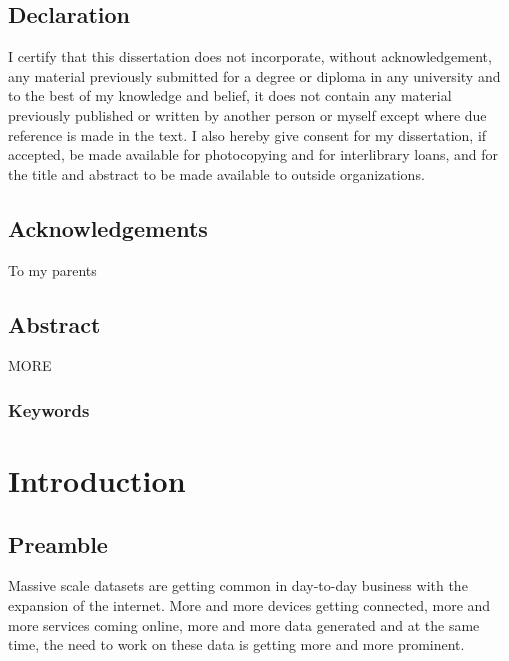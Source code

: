 \documentclass[12pt]{report}
\numberwithin{figure}{section}
\numberwithin{table}{section}
\begin{document}
\section*{Declaration}
%

I certify that this dissertation does not incorporate, without acknowledgement, any material previously submitted for a degree or diploma in any university and to the best of my knowledge and belief, it does not contain any material previously published or written by another person or myself except where due reference is made in the text. I also hereby give consent for my dissertation, if accepted, be made available for photocopying and for interlibrary loans, and for the title and abstract to be made available to outside organizations.

\newpage

\section*{Acknowledgements}
%
To my parents
\newpage


\section*{Abstract}
%

MORE

\subsection*{Keywords}

\newpage

\listoffigures

\tableofcontents

\newpage
{}



\chapter{Introduction}

\section{Preamble}

Massive scale datasets are getting common in day-to-day business with the expansion of the internet. More and more devices getting connected, more and more services coming online, more and more data generated and at the same time, the need to work on these data is getting more and more prominent.
\end{document}
